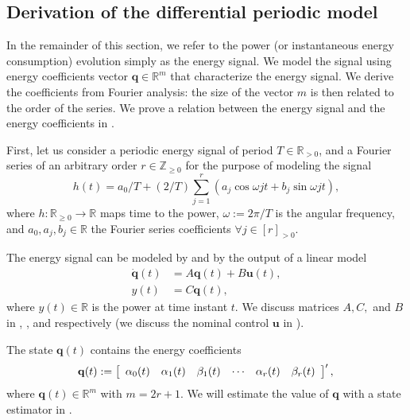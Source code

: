 \subsection{Derivation of the differential periodic model}
\label{sec:deriv}

In the remainder of this section, we refer to the power (or instantaneous energy consumption) evolution simply as the energy signal. We model the signal using energy coefficients vector $\mathbf{q}\in\mathbb{R}^m$ that characterize the energy signal. We derive the coefficients from Fourier analysis: the size of the vector $m$ is then related to the order of the series. We prove a relation between the energy signal and the energy coefficients in .
  
First, let us consider a periodic energy signal of period $T\in\mathbb{R}_{> 0}$, and a Fourier series of an arbitrary order $r\in\mathbb{Z}_{\geq 0}$ for the purpose of modeling the signal
\begin{equation}\label{eq:fourier}
  h(t)=a_0/T+(2/T)\sum_{j=1}^{r}{\left(a_j\cos{\omega jt}+b_j\sin{\omega jt}\right)},
\end{equation}
where $h:\mathbb{R}_{\geq 0}\rightarrow\mathbb{R}$ maps time to the power, $\omega:=2\pi/T$ is the angular frequency, and $a_0,a_j,b_j\in\mathbb{R}$ the Fourier series coefficients $\forall j\in[r]_{>0}$.

The energy signal can be modeled by  and by the output of a linear model
\begin{subequations}\label{eq:state-perf}\begin{align}
  \dot{\mathbf{q}}(t)&=A\mathbf{q}(t)+B\mathbf{u}(t),\\
  y(t)&=C\mathbf{q}(t)\label{eq:state-perf-output},
\end{align}\end{subequations}
where $y(t)\in\mathbb{R}$ is the power at time instant $t$. We discuss matrices $A,C,$ and $B$ in , , and  respectively (we discuss the nominal control $\mathbf{u}$ in ).

The state $\mathbf{q}(t)$ contains the energy coefficients
\begin{equation}\label{eq:state-details}
  \mathbf{q}(t):=\left[\begin{array}{cccccc}
    \alpha_0(t) & \alpha_1(t) & \beta_1(t) & \cdots & \alpha_r(t) & \beta_r(t)
  \end{array}\right]',\\
\end{equation}
where $\mathbf{q}(t)\in\mathbb{R}^m$ with $m=2r+1$. We will estimate the value of $\mathbf{q}$ with a state estimator in .

